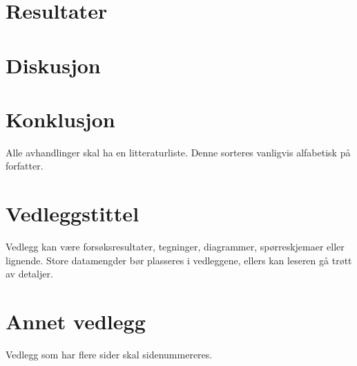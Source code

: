 \documentclass{USN-MSc}
\begin{document}
\section{Resultater}

\section{Diskusjon}

\section{Konklusjon}


Alle avhandlinger skal ha en litteraturliste. Denne sorteres vanligvis
alfabetisk på forfatter.

\nocite{*}
\printbibliography[heading=none]


\listoftables
\listoffigures

\USNappendix

\section{Vedleggstittel}

Vedlegg kan være forsøksresultater, tegninger, diagrammer, spørreskjemaer
eller lignende. Store datamengder bør plasseres i vedleggene, ellers kan
leseren gå trøtt av detaljer.

\section{Annet vedlegg}

Vedlegg som har flere sider skal sidenummereres.
\end{document}
